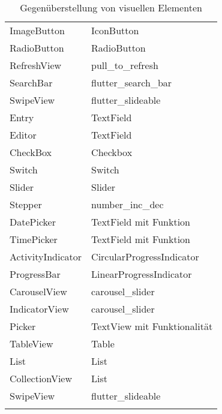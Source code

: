 \begin{xltabular}{\textwidth}{X|X}
	ImageButton		       			&  		IconButton 		\\ 
	RadioButton		       			&  		RadioButton 		\\ 
	RefreshView		       			&  		pull\_to\_refresh 		\\ 
	SearchBar		       				&  		flutter\_search\_bar 	\\ 
	SwipeView		       			&  		flutter\_slideable 		\\ 
	Entry		       						&  		TextField	 		\\ 
	Editor		       					&  		TextField	 		\\ 
	CheckBox		       				&  		Checkbox	 		\\ 
	Switch		       					&  		Switch	 		\\ 
	Slider		       					&  		Slider	 		\\ 
	Stepper		       				&  		number\_inc\_dec	 		\\ 
	DatePicker		       			&  		TextField mit Funktion		\\ 
	TimePicker		       			&  		TextField mit Funktion	 		\\ 
	ActivityIndicator		       	&  		CircularProgressIndicator 		\\ 
	ProgressBar		       			&  		LinearProgressIndicator 		\\ 
	CarouselView		       		&  		carousel\_slider  		\\ 
	IndicatorView		       		&  		carousel\_slider			\\ 	
	Picker		       					&  		TextView mit Funktionalität 		\\ 
	TableView		       				&  		Table		\\ 
	List		       						&  		List 		\\ 
	CollectionView		       		&  		List 		\\ 
	SwipeView		       			&  		flutter\_slideable 		\\ 	
	
\caption[]{Gegenüberstellung von visuellen Elementen}
 \label{tab:ComapreXFFlutter}
\end{xltabular}
